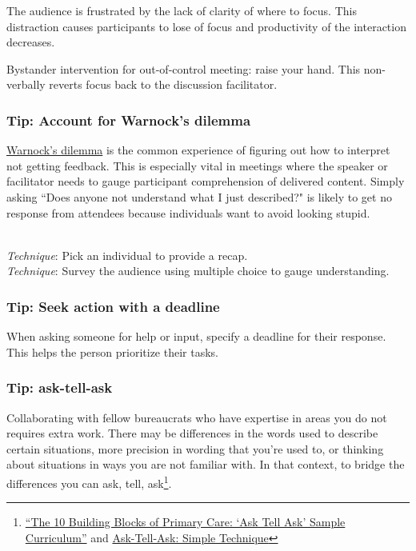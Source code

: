 The audience is frustrated by the lack of clarity of where to focus. This distraction causes participants to lose of focus and productivity of the interaction decreases.

Bystander intervention for out-of-control meeting: raise your hand.  This non-verbally reverts focus back to the discussion facilitator. 

\subsubsection{Tip: Account for Warnock's dilemma}
\href{https://en.wikipedia.org/wiki/Warnock\%27s_dilemma}{Warnock's dilemma}
is the common experience of figuring out how to interpret not getting feedback. This is especially vital in meetings where the speaker or facilitator needs to gauge participant comprehension of delivered content. Simply asking ``Does anyone not understand what I just described?" is likely to get no response from attendees because individuals want to avoid looking stupid.

\ \\
\textit{Technique}: Pick an individual to provide a recap.\\
\textit{Technique}: Survey the audience using multiple choice to gauge understanding.

\subsubsection{Tip: Seek action with a deadline}

When asking someone for help or input, specify a deadline for their response. This helps the person prioritize their tasks.


\subsubsection{Tip: ask-tell-ask}

Collaborating with fellow bureaucrats who have expertise in areas you do not requires extra work. There may be differences in the words used to describe certain situations, more precision in wording that you're used to, or thinking about situations in ways you are not familiar with. In that context, to bridge the differences you can ask, tell, ask\footnote{\href{https://cepc.ucsf.edu/sites/cepc.ucsf.edu/files/Curriculum_sample_14-0602.pdf}{``The 10 Building Blocks of Primary Care: `Ask Tell Ask' Sample Curriculum''} and \href{https://www.the-hospitalist.org/hospitalist/article/125126/qi-initiatives/ask-tell-ask-simple-technique-can-help-hospitalists}{Ask-Tell-Ask: Simple Technique}}. 

